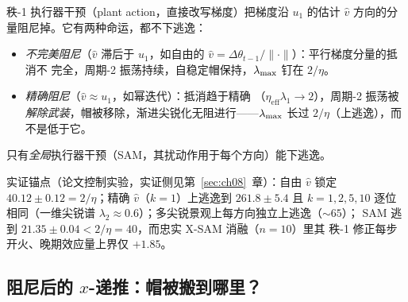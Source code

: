 \begin{claim}
秩-1 执行器干预（plant action，直接改写梯度）把梯度沿 $u_1$ 的估计
$\hat v$ 方向的分量阻尼掉。它有两种命运，都不下逃逸：
\begin{itemize}
  \item \emph{不完美阻尼}（$\hat v$ 滞后于 $u_1$，如自由的
        $\hat v=\Delta\theta_{t-1}/\|\cdot\|$）：平行梯度分量的抵消不
        完全，周期-2 振荡持续，自稳定帽保持，$\lambda_{\max}$ 钉在 $2/\eta$。
  \item \emph{精确阻尼}（$\hat v\approx u_1$，如幂迭代）：抵消趋于精确
        （$\eta_{\mathrm{eff}}\lambda_1\to2$），周期-2 振荡被
        \emph{解除武装}，帽被移除，渐进尖锐化无阻进行——$\lambda_{\max}$ 长过
        $2/\eta$（上逃逸），而不是低于它。
\end{itemize}
只有\emph{全局}执行器干预（SAM，其扰动作用于每个方向）能下逃逸。
\end{claim}

实证锚点（论文控制实验，实证侧见第~\ref{sec:ch08}~章）：自由 $\hat v$
锁定 $40.12\pm0.12=2/\eta$；精确 $\hat v$（$k=1$）上逃逸到
$261.8\pm5.4$ 且 $k=1,2,5,10$ 逐位相同（一维尖锐谱
$\lambda_2\approx0.6$）；多尖锐景观上每方向独立上逃逸（${\sim}65$）；
SAM 逃到 $21.35\pm0.04<2/\eta=40$，而忠实 X-SAM 消融（$n=10$）里其
秩-1 修正每步开火、晚期效应量上界仅 $+1.85$。

\subsection{阻尼后的 $x$-递推：帽被搬到哪里？}\label{sec:ch09-damped}

